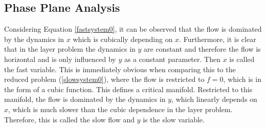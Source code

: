 \subsection{Phase Plane Analysis}
\begin{figure}[h]\centering
\end{figure}
Considering Equation \ref{fastsystem0}, it can be observed that the flow is dominated by the dynamics in $x$ which is cubically depending on $x$.
Furthermore, it is clear that in the layer problem the dynamics in $y$ are constant and therefore the flow is horizontal and is only influenced by $y$ as a constant parameter. Then $x$ is called the fast variable.
This is immediately obvious when comparing this to the reduced problem (\ref{slowsystem0}), where the flow is restricted to $f=0$, which is in the form of a cubic function. This defines a critical manifold. Restricted to this manifold, the flow is dominated by the dynamics in $y$, which linearly depends on $x$, which is much slower than the cubic dependence in the layer problem. Therefore, this is called the slow flow and $y$ is the slow variable. \\


